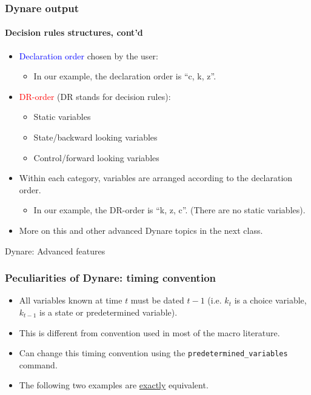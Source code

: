 \documentclass{beamer}
\begin{document}
\begin{frame}[fragile]
\frametitle{Dynare output}
\framesubtitle{Decision rules structures, cont'd}
\begin{itemize}
	\item \textcolor{blue}{Declaration order} chosen by the user: 
	\begin{itemize}
		\item In our example, the declaration order is ``c, k, z''.
	\end{itemize}
	\item \textcolor{red}{DR-order} (DR stands for decision rules): 
	\begin{itemize}
		\item Static variables
		\item State/backward looking variables
		\item Control/forward looking variables
	\end{itemize}
    \item Within each category, variables are arranged according to the declaration order.
    \begin{itemize}
    	\item In our example, the DR-order is ``k, z, c''. (There are no static variables).
    \end{itemize}
    \item More on this and other advanced Dynare topics in the next class.
\end{itemize}

\end{frame}





\begin{frame}
\begin{center}
	{\Large Dynare: Advanced features}
\end{center}
\end{frame}

\begin{frame}[fragile]
\frametitle{Peculiarities of Dynare: timing convention}
\begin{itemize}
	\item All variables known at time $ t $ must be dated $ t-1 $ (i.e. $ k_{t} $ is a choice variable, $ k_{t-1}$ is a state or predetermined variable).
	\item This is different from convention used in most of the macro literature.
	\item Can change this timing convention using the \texttt{predetermined\_variables} command.
	\item The following two examples are \underline{exactly} equivalent.
\end{itemize}
\end{frame}
\end{document}
